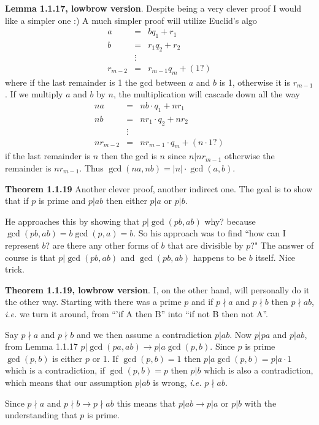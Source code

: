 \documentclass[aps,preprint,preprintnumbers,nofootinbib,showpacs,prd]{revtex4-1}
\newcommand{\ie}{{\it i.e.} }
\newcommand{\nbea}{\begin{eqnarray*}}
\newcommand{\neea}{\end{eqnarray*}}
\begin{document}
{\bf Lemma 1.1.17,  lowbrow version}. Despite being a very clever proof I would like a simpler one :) A much simpler proof will utilize Euclid's algo
%
\nbea
a & = & bq_1 + r_1 \\
b & = & r_1q_2 + r_2 \\
& \vdots & \\
r_{m-2} & = & r_{m-1} q_m + (1?)
\neea
%
where if the last remainder is 1 the gcd between $a$ and $b$ is 1, otherwise it is $r_{m-1}$. If we multiply $a$ and $b$ by $n$, the multiplication will cascade down all the way
%
\nbea
na & = & nb \cdot q_1 + nr_1 \\
nb & = & nr_1 \cdot q_2 + nr_2 \\
& \vdots & \\
nr_{m-2} & = & nr_{m-1} \cdot q_m + (n \cdot 1?)
\neea
%
if the last remainder is $n$ then the gcd is $n$ since $ n | nr_{m-1}$ otherwise the remainder is $nr_{m-1}$. Thus $\gcd(na,nb) = |n| \cdot \gcd(a,b)$.

{\bf Theorem 1.1.19} Another clever proof, another indirect one. The goal is to show that if $p$ is prime and $p|ab$ then either $p|a$ or $p|b$.

He approaches this by showing that $p|\gcd(pb, ab)$ why? because $\gcd(pb, ab) = b\gcd(p, a) = b$. So his approach was to find ``how can I represent $b$? are there any other forms of $b$ that are divisible by $p$?" The answer of course is that $p|\gcd(pb, ab)$ and $\gcd(pb, ab)$ happens to be $b$ itself. Nice trick.

{\bf Theorem 1.1.19, lowbrow version}. I, on the other hand, will personally do it the other way. Starting with there was a prime $p$ and if $p \nmid a$ and $p \nmid b$ then $p \nmid ab$, \ie we turn it around, from ``'if A then B'' into ``if not B then not A''.

Say $p \nmid a$ and $p \nmid b$ and we then assume a contradiction $p | ab$. Now $p | pa$ and $p | ab$, from Lemma 1.1.17 $p | \gcd(pa,ab) \to p | a \gcd (p,b)$. Since $p$ is prime $\gcd(p,b)$ is either $p$ or 1. If $\gcd(p,b) = 1$ then $p | a \gcd (p,b) = p|a \cdot 1$ which is a contradiction, if $\gcd(p,b) = p$ then $p|b$ which is also a contradiction, which means that our assumption $p|ab$ is wrong, \ie $p \nmid ab$.

Since $p \nmid a$ and $p \nmid b \longrightarrow p \nmid ab$ this means that $p|ab \longrightarrow p|a$ or $p|b$ with the understanding that $p$ is prime.
\end{document}
